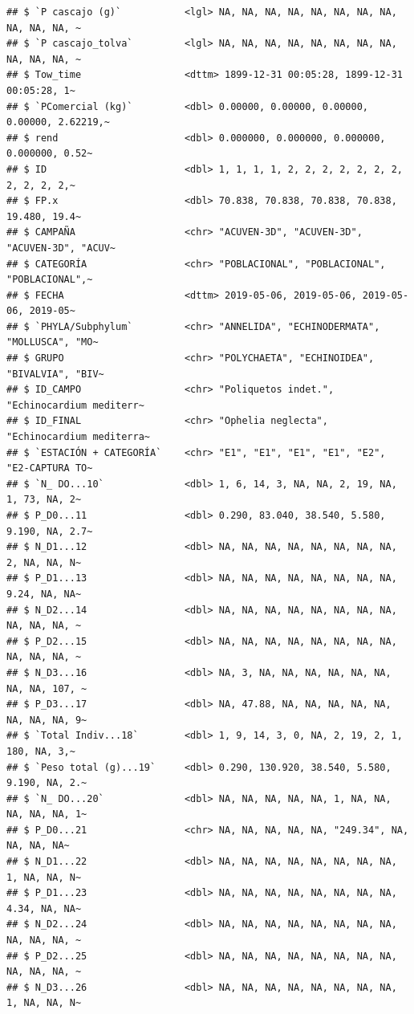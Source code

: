 \documentclass[
]{article}
\begin{document}
\begin{verbatim}
## $ `P cascajo (g)`           <lgl> NA, NA, NA, NA, NA, NA, NA, NA, NA, NA, NA, ~
## $ `P cascajo_tolva`         <lgl> NA, NA, NA, NA, NA, NA, NA, NA, NA, NA, NA, ~
## $ Tow_time                  <dttm> 1899-12-31 00:05:28, 1899-12-31 00:05:28, 1~
## $ `PComercial (kg)`         <dbl> 0.00000, 0.00000, 0.00000, 0.00000, 2.62219,~
## $ rend                      <dbl> 0.000000, 0.000000, 0.000000, 0.000000, 0.52~
## $ ID                        <dbl> 1, 1, 1, 1, 2, 2, 2, 2, 2, 2, 2, 2, 2, 2, 2,~
## $ FP.x                      <dbl> 70.838, 70.838, 70.838, 70.838, 19.480, 19.4~
## $ CAMPAÑA                   <chr> "ACUVEN-3D", "ACUVEN-3D", "ACUVEN-3D", "ACUV~
## $ CATEGORÍA                 <chr> "POBLACIONAL", "POBLACIONAL", "POBLACIONAL",~
## $ FECHA                     <dttm> 2019-05-06, 2019-05-06, 2019-05-06, 2019-05~
## $ `PHYLA/Subphylum`         <chr> "ANNELIDA", "ECHINODERMATA", "MOLLUSCA", "MO~
## $ GRUPO                     <chr> "POLYCHAETA", "ECHINOIDEA", "BIVALVIA", "BIV~
## $ ID_CAMPO                  <chr> "Poliquetos indet.", "Echinocardium mediterr~
## $ ID_FINAL                  <chr> "Ophelia neglecta", "Echinocardium mediterra~
## $ `ESTACIÓN + CATEGORÍA`    <chr> "E1", "E1", "E1", "E1", "E2", "E2-CAPTURA TO~
## $ `N_ DO...10`              <dbl> 1, 6, 14, 3, NA, NA, 2, 19, NA, 1, 73, NA, 2~
## $ P_D0...11                 <dbl> 0.290, 83.040, 38.540, 5.580, 9.190, NA, 2.7~
## $ N_D1...12                 <dbl> NA, NA, NA, NA, NA, NA, NA, NA, 2, NA, NA, N~
## $ P_D1...13                 <dbl> NA, NA, NA, NA, NA, NA, NA, NA, 9.24, NA, NA~
## $ N_D2...14                 <dbl> NA, NA, NA, NA, NA, NA, NA, NA, NA, NA, NA, ~
## $ P_D2...15                 <dbl> NA, NA, NA, NA, NA, NA, NA, NA, NA, NA, NA, ~
## $ N_D3...16                 <dbl> NA, 3, NA, NA, NA, NA, NA, NA, NA, NA, 107, ~
## $ P_D3...17                 <dbl> NA, 47.88, NA, NA, NA, NA, NA, NA, NA, NA, 9~
## $ `Total Indiv...18`        <dbl> 1, 9, 14, 3, 0, NA, 2, 19, 2, 1, 180, NA, 3,~
## $ `Peso total (g)...19`     <dbl> 0.290, 130.920, 38.540, 5.580, 9.190, NA, 2.~
## $ `N_ DO...20`              <dbl> NA, NA, NA, NA, NA, 1, NA, NA, NA, NA, NA, 1~
## $ P_D0...21                 <chr> NA, NA, NA, NA, NA, "249.34", NA, NA, NA, NA~
## $ N_D1...22                 <dbl> NA, NA, NA, NA, NA, NA, NA, NA, 1, NA, NA, N~
## $ P_D1...23                 <dbl> NA, NA, NA, NA, NA, NA, NA, NA, 4.34, NA, NA~
## $ N_D2...24                 <dbl> NA, NA, NA, NA, NA, NA, NA, NA, NA, NA, NA, ~
## $ P_D2...25                 <dbl> NA, NA, NA, NA, NA, NA, NA, NA, NA, NA, NA, ~
## $ N_D3...26                 <dbl> NA, NA, NA, NA, NA, NA, NA, NA, 1, NA, NA, N~

\end{verbatim}
\end{document}
